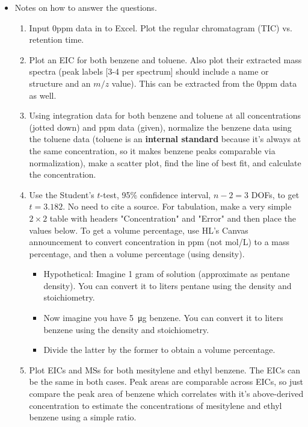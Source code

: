 \documentclass[../notes.tex]{subfiles}
\begin{document}
\begin{itemize}
\begin{itemize}
    \end{itemize}
    \item Notes on how to answer the questions.
    \begin{enumerate}
        \item Input 0ppm data in to Excel. Plot the regular chromatagram (TIC) vs. retention time.
        \item Plot an EIC for both benzene and toluene. Also plot their extracted mass spectra (peak labels [3-4 per spectrum] should include a name or structure and an $m/z$ value). This can be extracted from the 0ppm data as well.
        \item Using integration data for both benzene and toluene at all concentrations (jotted down) and ppm data (given), normalize the benzene data using the toluene data (toluene is an \textbf{internal standard} because it's always at the same concentration, so it makes benzene peaks comparable via normalization), make a scatter plot, find the line of best fit, and calculate the concentration.
        \item Use the Student's $t$-test, 95\% confidence interval, $n-2=3$ DOFs, to get $t=3.182$. No need to cite a source. For tabulation, make a very simple $2\times 2$ table with headers "Concentration" and "Error" and then place the values below. To get a volume percentage, use HL's Canvas announcement to convert concentration in ppm (not mol/L) to a mass percentage, and then a volume percentage (using density).
        \begin{itemize}
            \item Hypothetical: Imagine 1 gram of solution (approximate as pentane density). You can convert it to liters pentane using the density and stoichiometry.
            \item Now imagine you have \SI{5}{\micro\gram} benzene. You can convert it to liters benzene using the density and stoichiometry.
            \item Divide the latter by the former to obtain a volume percentage.
        \end{itemize}
        \item Plot EICs and MSs for both mesitylene and ethyl benzene. The EICs can be the same in both cases. Peak areas are comparable across EICs, so just compare the peak area of benzene which correlates with it's above-derived concentration to estimate the concentrations of mesitylene and ethyl benzene using a simple ratio.
    \end{enumerate}
\end{itemize}
\end{document}
